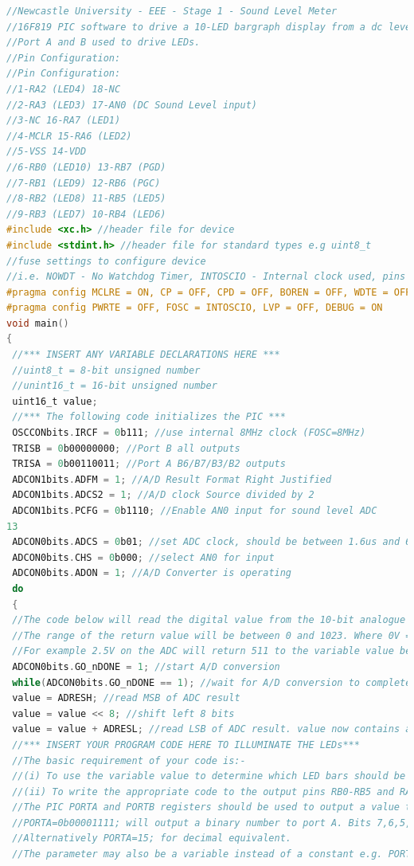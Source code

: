 \documentclass[10pt,a4paper]{article}
\begin{document}
\begin{lstlisting}[caption={PIC Code},label={lst:code},language= C]
//Newcastle University - EEE - Stage 1 - Sound Level Meter
//16F819 PIC software to drive a 10-LED bargraph display from a dc level on ADC input 0 (AN0).
//Port A and B used to drive LEDs.
//Pin Configuration:
//Pin Configuration:
//1-RA2 (LED4) 18-NC
//2-RA3 (LED3) 17-AN0 (DC Sound Level input)
//3-NC 16-RA7 (LED1)
//4-MCLR 15-RA6 (LED2)
//5-VSS 14-VDD
//6-RB0 (LED10) 13-RB7 (PGD)
//7-RB1 (LED9) 12-RB6 (PGC)
//8-RB2 (LED8) 11-RB5 (LED5)
//9-RB3 (LED7) 10-RB4 (LED6)
#include <xc.h> //header file for device
#include <stdint.h> //header file for standard types e.g uint8_t
//fuse settings to configure device
//i.e. NOWDT - No Watchdog Timer, INTOSCIO - Internal clock used, pins available for I/O
#pragma config MCLRE = ON, CP = OFF, CPD = OFF, BOREN = OFF, WDTE = OFF
#pragma config PWRTE = OFF, FOSC = INTOSCIO, LVP = OFF, DEBUG = ON
void main()
{
 //*** INSERT ANY VARIABLE DECLARATIONS HERE ***
 //uint8_t = 8-bit unsigned number
 //unint16_t = 16-bit unsigned number
 uint16_t value;
 //*** The following code initializes the PIC ***
 OSCCONbits.IRCF = 0b111; //use internal 8MHz clock (FOSC=8MHz)
 TRISB = 0b00000000; //Port B all outputs
 TRISA = 0b00110011; //Port A B6/B7/B3/B2 outputs
 ADCON1bits.ADFM = 1; //A/D Result Format Right Justified
 ADCON1bits.ADCS2 = 1; //A/D clock Source divided by 2
 ADCON1bits.PCFG = 0b1110; //Enable AN0 input for sound level ADC
13
 ADCON0bits.ADCS = 0b01; //set ADC clock, should be between 1.6us and 6.4us (1/8MHz x 16 = 2us)
 ADCON0bits.CHS = 0b000; //select AN0 for input
 ADCON0bits.ADON = 1; //A/D Converter is operating
 do
 {
 //The code below will read the digital value from the 10-bit analogue to digital converter.
 //The range of the return value will be between 0 and 1023. Where 0V = 0 and 5V = 1023.
 //For example 2.5V on the ADC will return 511 to the variable value below.
 ADCON0bits.GO_nDONE = 1; //start A/D conversion
 while(ADCON0bits.GO_nDONE == 1); //wait for A/D conversion to complete
 value = ADRESH; //read MSB of ADC result
 value = value << 8; //shift left 8 bits
 value = value + ADRESL; //read LSB of ADC result. value now contains a 10-bit ADC number
 //*** INSERT YOUR PROGRAM CODE HERE TO ILLUMINATE THE LEDs***
 //The basic requirement of your code is:-
 //(i) To use the variable value to determine which LED bars should be switched on.
 //(ii) To write the appropriate code to the output pins RB0-RB5 and RA2,RA3,RA6,RA7.
 //The PIC PORTA and PORTB registers should be used to output a value to the Port pins
 //PORTA=0b00001111; will output a binary number to port A. Bits 7,6,5,4=0 and Bits 3,2,1,0=1.
 //Alternatively PORTA=15; for decimal equivalent.
 //The parameter may also be a variable instead of a constant e.g. PORTA=value;
 

\end{lstlisting}
\end{document}
